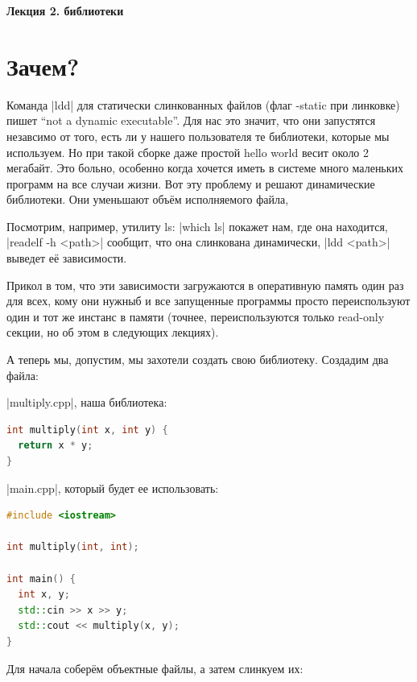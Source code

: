 \documentclass[11pt]{article}
\begin{document}
{\Huge\bfseries Лекция 2.  библиотеки\par}

\vspace{2em}

\section{Зачем?}

Команда \nolint|ldd| для статически  слинкованных файлов (флаг -static при линковке) пишет ``not a dynamic executable''. Для нас это значит, что они запустятся незавсимо от того, есть ли у нашего пользователя те библиотеки, которые мы используем. Но при такой сборке даже простой hello world весит около 2 мегабайт. Это больно, особенно когда хочется иметь в системе много маленьких программ на все случаи жизни. Вот эту проблему и решают динамические библиотеки. Они уменьшают объём исполняемого файла,

Посмотрим, например, утилиту ls:
\newline
\nolint|which ls| покажет нам, где она находится,
\newline
\nolint|readelf -h <path>| сообщит, что она слинкована динамически,
\newline
\nolint|ldd <path>| выведет её зависимости.

Прикол в том, что эти зависимости загружаются в оперативную память один раз для всех, кому они нужныб и все запущенные программы просто переиспользуют один и тот же инстанс в памяти (точнее, переиспользуются только read-only секции, но об этом в следующих лекциях).

А теперь мы, допустим, мы захотели создать свою библиотеку.
Создадим два файла:

\nolint|multiply.cpp|, наша библиотека:
\begin{lstlisting}[language=C++]
int multiply(int x, int y) {
  return x * y;
}
\end{lstlisting}

\nolint|main.cpp|, который будет ее использовать:
\begin{lstlisting}[language=C++]
#include <iostream>

int multiply(int, int);

int main() {
  int x, y;
  std::cin >> x >> y;
  std::cout << multiply(x, y);
}
\end{lstlisting}

\newpage

Для начала соберём объектные файлы, а затем слинкуем их:
\end{document}
